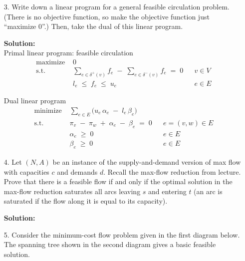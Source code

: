 \documentclass{article}
\begin{document}
\begin{enumerate}
    \newpage

    \item[3.] Write down a linear program for a general feasible circulation problem. (There is no objective function, so make the objective function just ``maximize 0''.)
    Then, take the dual of this linear program.

    \textbf{Solution:} \\

Primal linear program: feasible circulation
\begin{align*}
\text{maximize } & 0 \\[6pt]
\text{s.t. } 
& \sum_{e \in \delta^{+}(v)} f_e \;-\; \sum_{e \in \delta^{-}(v)} f_e \;=\; 0 && v \in V \\[4pt]
& l_e \;\le\; f_e \;\le\; u_e && e \in E
\end{align*}

Dual linear program
\begin{align*}
\text{minimize } & \sum_{e \in E} \bigl(u_e \,\alpha_e \;-\; l_e \,\beta_e\bigr) \\[6pt]
\text{s.t. } 
& \pi_v \;-\; \pi_w \;+\; \alpha_e \;-\; \beta_e \;=\; 0 && e = (v,w) \in E \\[4pt]
& \alpha_e \;\ge\; 0 && e \in E \\[2pt]
& \beta_e \;\ge\; 0 && e \in E
\end{align*}

    \newpage

    \item[4.] Let $(N, A)$ be an instance of the supply-and-demand version of max flow with capacities $c$ and demands $d$. Recall the max-flow reduction from lecture. Prove that there is a feasible flow if and only if the optimal solution in the max-flow reduction saturates all arcs leaving $s$ and entering $t$ (an arc is saturated if the flow along it is equal to its capacity).

    \textbf{Solution:} \\



    \newpage

    \item[5.] Consider the minimum-cost flow problem given in the first diagram below. The spanning tree shown in the second diagram gives a basic feasible solution.

    \begin{figure}[h]
    \centering
        \begin{subfigure}
            \centering
\end{subfigure}
\end{figure}
\end{enumerate}
\end{document}
